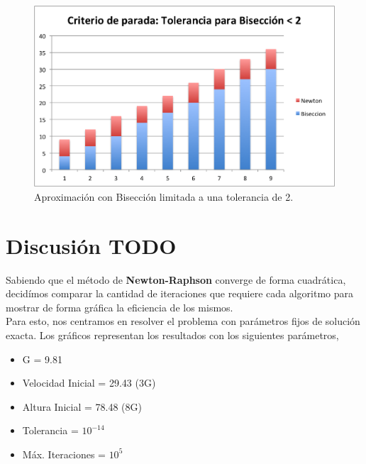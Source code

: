 \documentclass[a4paper]{article}
\begin{document}
\begin{figure}[H]
  \centering
  \includegraphics[scale=0.80]{graficos/3-BiseccionXTolerancia.png}
  \caption{Aproximación con Bisección limitada a una tolerancia de 2. }
\end{figure}


\section{Discusión TODO}
Sabiendo que el método de \textbf{Newton-Raphson} converge de forma cuadrática, decidímos comparar la cantidad de iteraciones que requiere cada algoritmo para mostrar de forma gráfica la eficiencia de los mismos. \\

Para esto, nos centramos en resolver el problema con parámetros fijos de solución exacta.
Los gráficos representan los resultados con los siguientes parámetros, 
\begin{itemize}
  \item{G = 9.81}
  \item{Velocidad Inicial = 29.43 (3G)} 
  \item{Altura Inicial = 78.48 (8G)} 
  \item{Tolerancia = $10^{-14}$} 
  \item{Máx. Iteraciones = $10^5$}
\end{itemize}
\end{document}
